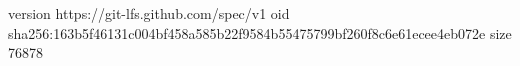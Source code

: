 version https://git-lfs.github.com/spec/v1
oid sha256:163b5f46131c004bf458a585b22f9584b55475799bf260f8c6e61ecee4eb072e
size 76878
